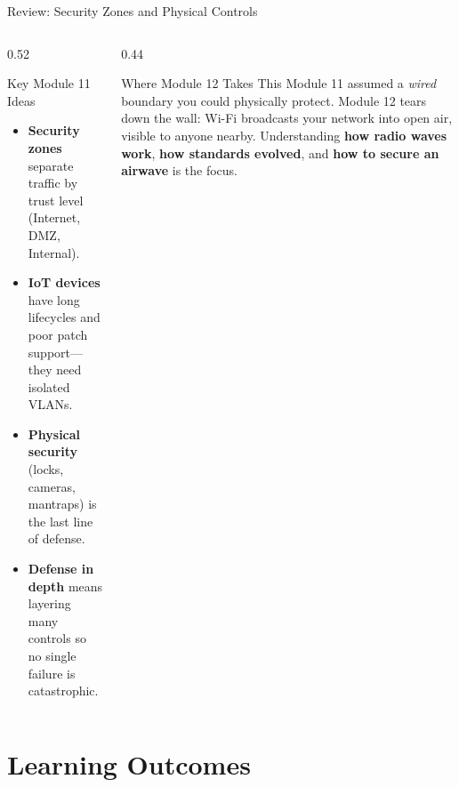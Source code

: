 \documentclass[aspectratio=169]{beamer}
\begin{document}
\begin{frame}{Review: Security Zones and Physical Controls}
    \begin{columns}[T]
        \begin{column}{0.52\textwidth}
            \begin{block}{Key Module 11 Ideas}
                \footnotesize
                \begin{itemize}
                    \item \textbf{Security zones} separate traffic by trust level (Internet, DMZ, Internal).
                    \item \textbf{IoT devices} have long lifecycles and poor patch support---they need isolated VLANs.
                    \item \textbf{Physical security} (locks, cameras, mantraps) is the last line of defense.
                    \item \textbf{Defense in depth} means layering many controls so no single failure is catastrophic.
                \end{itemize}
            \end{block}
        \end{column}
        \begin{column}{0.44\textwidth}
            \begin{alertblock}{Where Module 12 Takes This}
                \footnotesize
                Module 11 assumed a \emph{wired} boundary you could physically protect. Module 12 tears down the wall: Wi-Fi broadcasts your network into open air, visible to anyone nearby. Understanding \textbf{how radio waves work}, \textbf{how standards evolved}, and \textbf{how to secure an airwave} is the focus.
            \end{alertblock}
        \end{column}
    \end{columns}
\end{frame}

\section*{Learning Outcomes}
\end{document}
